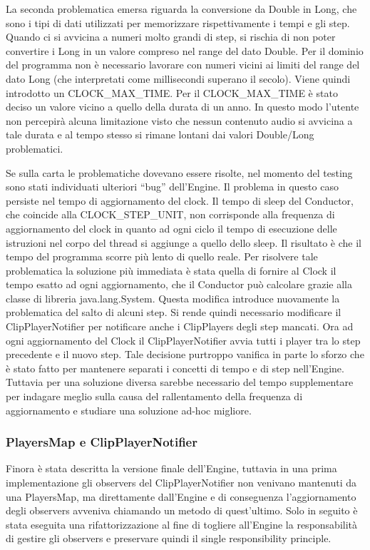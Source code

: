 \documentclass[a4paper,12pt]{report}
\begin{document}
La seconda problematica emersa riguarda la conversione da Double in Long, che sono i tipi di dati utilizzati per memorizzare rispettivamente i tempi e gli step.
Quando ci si avvicina a numeri molto grandi di step, si rischia di non poter convertire i Long in un valore compreso nel range del dato Double. Per il dominio del programma non è necessario lavorare con numeri vicini ai limiti del range del dato Long (che interpretati come millisecondi superano il secolo). Viene quindi introdotto un CLOCK\_MAX\_TIME. 
Per il CLOCK\_MAX\_TIME è stato deciso un valore vicino a quello della durata di un anno. In questo modo l’utente non percepirà alcuna limitazione visto che nessun contenuto audio si avvicina a tale durata e al tempo stesso si rimane lontani dai valori Double/Long problematici.

Se sulla carta le problematiche dovevano essere risolte, nel momento del testing sono stati individuati ulteriori “bug” dell’Engine.
Il problema in questo caso persiste nel tempo di aggiornamento del clock. 
Il tempo di sleep del Conductor, che coincide alla CLOCK\_STEP\_UNIT, non corrisponde alla frequenza di aggiornamento del clock in quanto ad ogni ciclo il tempo di esecuzione delle istruzioni nel corpo del thread si aggiunge a quello dello sleep. Il risultato è che il tempo del programma scorre più lento di quello reale.
Per risolvere tale problematica la soluzione più immediata è stata quella di fornire al Clock il tempo esatto ad ogni aggiornamento, che il Conductor può calcolare grazie alla classe di libreria java.lang.System.
Questa modifica introduce nuovamente la problematica del salto di alcuni step. Si rende quindi necessario modificare il ClipPlayerNotifier per notificare anche i ClipPlayers degli step mancati. Ora ad ogni aggiornamento del Clock il ClipPlayerNotifier avvia tutti i player tra lo step precedente e il nuovo step.
Tale decisione purtroppo vanifica in parte lo sforzo che è stato fatto per mantenere separati i concetti di tempo e di step nell’Engine. Tuttavia per una soluzione diversa sarebbe necessario del tempo supplementare per indagare meglio sulla causa del rallentamento della frequenza di aggiornamento e studiare una soluzione ad-hoc migliore.

\subsubsection{PlayersMap e ClipPlayerNotifier}
Finora è stata descritta la versione finale dell’Engine, tuttavia in una prima implementazione gli observers del ClipPlayerNotifier non venivano mantenuti da una PlayersMap, ma direttamente dall’Engine e di conseguenza l’aggiornamento degli observers avveniva chiamando un metodo di quest'ultimo. 
Solo in seguito è stata eseguita una rifattorizzazione al fine di togliere all’Engine la responsabilità di gestire gli observers e preservare quindi il single responsibility principle.
\end{document}
